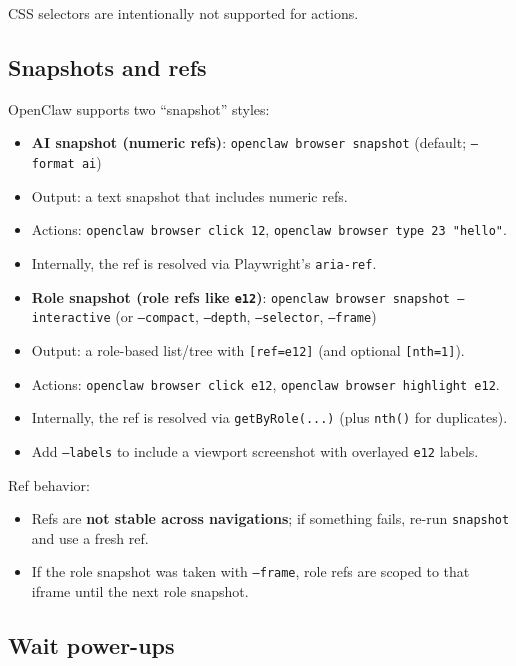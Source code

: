 CSS selectors are intentionally not supported for actions.

\subsection{Snapshots and refs}


OpenClaw supports two “snapshot” styles:

\begin{itemize}
  \item \textbf{AI snapshot (numeric refs)}: \texttt{openclaw browser snapshot} (default; \texttt{--format ai})
  \item Output: a text snapshot that includes numeric refs.
  \item Actions: \texttt{openclaw browser click 12}, \texttt{openclaw browser type 23 "hello"}.
  \item Internally, the ref is resolved via Playwright’s \texttt{aria-ref}.
\end{itemize}


\begin{itemize}
  \item \textbf{Role snapshot (role refs like \texttt{e12})}: \texttt{openclaw browser snapshot --interactive} (or \texttt{--compact}, \texttt{--depth}, \texttt{--selector}, \texttt{--frame})
  \item Output: a role-based list/tree with \texttt{[ref=e12]} (and optional \texttt{[nth=1]}).
  \item Actions: \texttt{openclaw browser click e12}, \texttt{openclaw browser highlight e12}.
  \item Internally, the ref is resolved via \texttt{getByRole(...)} (plus \texttt{nth()} for duplicates).
  \item Add \texttt{--labels} to include a viewport screenshot with overlayed \texttt{e12} labels.
\end{itemize}


Ref behavior:

\begin{itemize}
  \item Refs are \textbf{not stable across navigations}; if something fails, re-run \texttt{snapshot} and use a fresh ref.
  \item If the role snapshot was taken with \texttt{--frame}, role refs are scoped to that iframe until the next role snapshot.
\end{itemize}


\subsection{Wait power-ups}


